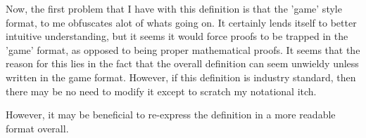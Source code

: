\documentclass[12pt,titlepage]{article}
\begin{document}
Now, the first problem that I have with this definition is that the 'game' style format, to me obfuscates alot of whats going on. It certainly lends itself to better intuitive understanding, but it seems it would force proofs to be trapped in the 'game' format, as opposed to being proper mathematical proofs. It seems that the reason for this lies in the fact that the overall definition can seem unwieldy unless written in the game format. However, if this definition is industry standard, then there may be no need to modify it except to scratch my notational itch.

However, it may be beneficial to re-express the definition in a more readable format overall. 
\end{document}
